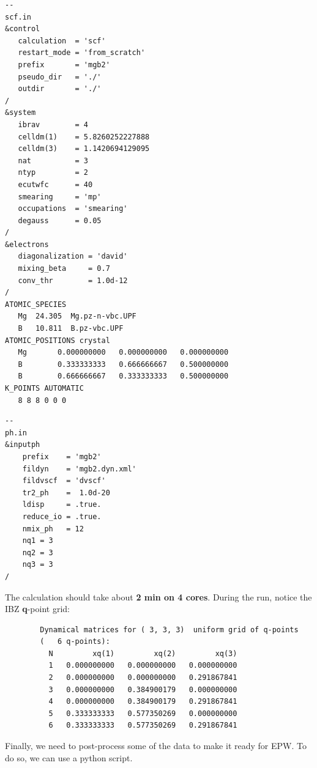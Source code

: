 \documentclass[a4paper,11pt,serif]{article}
\begin{document}
\begin{scriptsize}
 \begin{Verbatim}[frame=single]
--                                                                                                  scf.in
&control
   calculation  = 'scf'
   restart_mode = 'from_scratch'
   prefix       = 'mgb2'
   pseudo_dir   = './'
   outdir       = './'
/
&system
   ibrav        = 4
   celldm(1)    = 5.8260252227888
   celldm(3)    = 1.1420694129095
   nat          = 3
   ntyp         = 2
   ecutwfc      = 40
   smearing     = 'mp'
   occupations  = 'smearing'
   degauss      = 0.05
/
&electrons
   diagonalization = 'david'
   mixing_beta     = 0.7
   conv_thr        = 1.0d-12
/
ATOMIC_SPECIES
   Mg  24.305  Mg.pz-n-vbc.UPF
   B   10.811  B.pz-vbc.UPF
ATOMIC_POSITIONS crystal
   Mg       0.000000000   0.000000000   0.000000000
   B        0.333333333   0.666666667   0.500000000
   B        0.666666667   0.333333333   0.500000000
K_POINTS AUTOMATIC
   8 8 8 0 0 0
\end{Verbatim}
\end{scriptsize}

\begin{scriptsize}
 \begin{Verbatim}[frame=single]
--                                                                                                  ph.in
&inputph
    prefix    = 'mgb2'
    fildyn    = 'mgb2.dyn.xml'
    fildvscf  = 'dvscf'
    tr2_ph    =  1.0d-20
    ldisp     = .true.
    reduce_io = .true.
    nmix_ph   = 12
    nq1 = 3
    nq2 = 3
    nq3 = 3
/
\end{Verbatim}
\end{scriptsize}

The calculation should take about \textbf{2 min on 4 cores}. During the run, notice the IBZ \textbf{q}-point grid:
{\color{cverb}\small
\begin{verbatim}
        Dynamical matrices for ( 3, 3, 3)  uniform grid of q-points
        (   6 q-points):
          N         xq(1)         xq(2)         xq(3)
          1   0.000000000   0.000000000   0.000000000
          2   0.000000000   0.000000000   0.291867841
          3   0.000000000   0.384900179   0.000000000
          4   0.000000000   0.384900179   0.291867841
          5   0.333333333   0.577350269   0.000000000
          6   0.333333333   0.577350269   0.291867841
\end{verbatim}
}

Finally, we need to post-process some of the data to make it ready for EPW.
%
To do so, we can use a python script.
\end{document}
